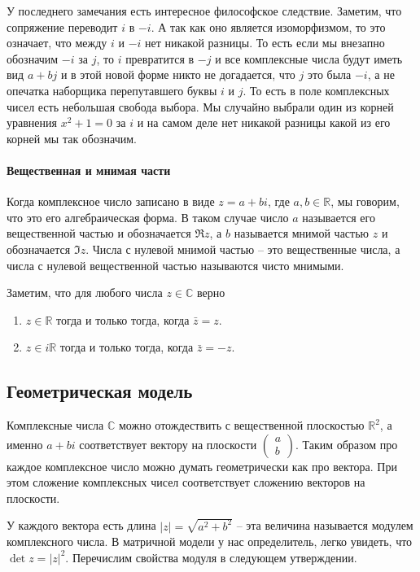 У последнего замечания есть интересное философское следствие. Заметим, что сопряжение переводит $i$ в $-i$. А так как оно является изоморфизмом, то это означает, что между $i$ и $-i$ нет никакой разницы. То есть если мы внезапно обозначим $-i$ за $j$, то $i$ превратится в $-j$ и все комплексные числа будут иметь вид $a + bj$ и в этой новой форме никто не догадается, что $j$ это была $-i$, а не опечатка наборщика перепутавшего буквы $i$ и $j$. То есть в поле комплексных чисел есть небольшая свобода выбора. Мы случайно выбрали один из корней уравнения $x^2 + 1 = 0$ за $i$ и на самом деле нет никакой разницы какой из его корней мы так обозначим.

\paragraph{Вещественная и мнимая части} Когда комплексное число записано в виде $z = a + bi$, где $a,b\in\mathbb R$, мы говорим, что это его алгебраическая форма. В таком случае число $a$ называется его вещественной частью и обозначается $\Re z$, а $b$ называется мнимой частью $z$ и обозначается $\Im z$. Числа с нулевой мнимой частью -- это вещественные числа, а числа с нулевой вещественной частью называются чисто мнимыми. 

Заметим, что для любого числа $z\in\mathbb C$ верно
\begin{enumerate}
\item $z\in \mathbb R$ тогда и только тогда, когда $\bar z= z$.
\item $z\in i\mathbb R$ тогда и только тогда, когда $\bar z = - z$.
\end{enumerate}

\subsection{Геометрическая модель}

Комплексные числа $\mathbb C$ можно отождествить с вещественной плоскостью $\mathbb R^2$, а именно $a+bi$ соответствует вектору на плоскости $\left(\begin{smallmatrix}a\\b\end{smallmatrix}\right)$. Таким образом про каждое комплексное число можно думать геометрически как про вектора. При этом сложение комплексных чисел соответствует сложению векторов на плоскости.

У каждого вектора есть длина $|z| = \sqrt{a^2 + b^2}$ -- эта величина называется модулем комплексного числа. В матричной модели у нас определитель, легко увидеть, что $\det z = |z|^2$. Перечислим свойства модуля в следующем утверждении.

